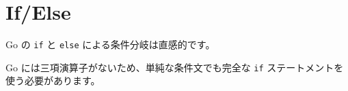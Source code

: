 \section{If/Else}

Go の \texttt{if} と \texttt{else} による条件分岐は直感的です。




Go には三項演算子がないため、単純な条件文でも完全な \texttt{if} ステートメントを使う必要があります。